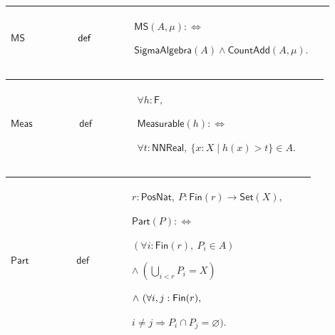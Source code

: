 \documentclass[12pt,reqno]{amsart}
\theoremstyle{blueplain}
\numberwithin{equation}{section}
\begin{document}
{\scriptsize \setlength{\parskip}{0pt}\nointerlineskip
\noindent 
\begin{tabular}{|@{}>{\centering\arraybackslash}m{0.19251\linewidth}|>{\centering\arraybackslash}m{0.16845\linewidth}|>{\centering\arraybackslash}m{0.53904\linewidth}|}
\hline
\hypertarget{def:MS}{$\displaystyle \mathsf{MS}$} & $\displaystyle \mathsf{%
def}$ & $\displaystyle \mathsf{MS}(A,\mu):\Longleftrightarrow$\par$%
\displaystyle \mathsf{SigmaAlgebra}(A)\land\mathsf{CountAdd}(A,\mu).$ \\ 
\hline
\end{tabular}%
}

{\scriptsize \setlength{\parskip}{0pt}\nointerlineskip
\noindent 
\begin{tabular}{|@{}>{\centering\arraybackslash}m{0.19251\linewidth}|>{\centering\arraybackslash}m{0.16845\linewidth}|>{\centering\arraybackslash}m{0.53904\linewidth}|}
\hline
\hypertarget{def:Meas}{$\displaystyle \mathsf{Meas}$} & $\displaystyle 
\mathsf{def}$ & $\displaystyle \forall h:\mathsf{F},$\par$\displaystyle 
\mathsf{Measurable}(h):\Longleftrightarrow$\par$\displaystyle \forall t:%
\mathsf{NNReal},\ \{x:X\mid h(x)>t\}\in A.$ \\ \hline
\end{tabular}%
}

{\scriptsize \setlength{\parskip}{0pt}\nointerlineskip
\noindent 
\begin{tabular}{|@{}>{\centering\arraybackslash}m{0.19251\linewidth}|>{\centering\arraybackslash}m{0.16845\linewidth}|>{\centering\arraybackslash}m{0.53904\linewidth}|}
\hline
\hypertarget{def:Part}{$\displaystyle \mathsf{Part}$} & $\displaystyle 
\mathsf{def}$ & $\displaystyle r:\mathsf{PosNat},\ P:\mathsf{Fin}(r)\to%
\mathsf{Set}(X),$\par$\displaystyle \mathsf{Part}(P):\Longleftrightarrow$\par%
$\displaystyle (\forall i:\mathsf{Fin}(r),\ P_i\in A)$\par$\displaystyle %
\land\ (\bigcup_{i<r}P_i=X)$\par$\displaystyle \land\ (\forall i,j:\mathsf{%
Fin}(r),$\par$\displaystyle i\ne j\Rightarrow P_i\cap P_j=\varnothing).$ \\ 
\hline
\end{tabular}%
}
\end{document}

